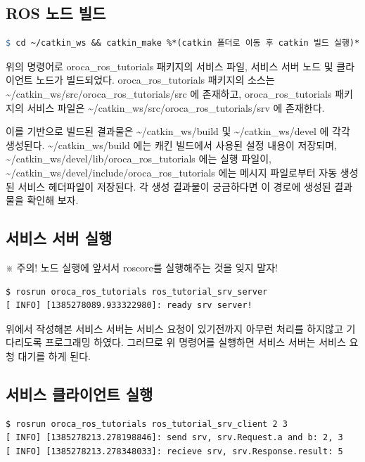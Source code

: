 \subsection{ROS 노드 빌드}

\begin{lstlisting}[language=make]
$ cd ~/catkin_ws && catkin_make %*(catkin 폴더로 이동 후 catkin 빌드 실행)*)
\end{lstlisting}

위의 명령어로 oroca\_ros\_tutorials 패키지의 서비스 파일, 서비스 서버 노드 및 클라이언트 노드가 빌드되었다. oroca\_ros\_tutorials 패키지의 소스는 \textasciitilde/catkin\_ws/src/oroca\_ros\_tutorials/src 에 존재하고, oroca\_ros\_tutorials 패키지의 서비스 파일은 \textasciitilde/catkin\_ws/src/oroca\_ros\_tutorials/srv 에 존재한다.

이를 기반으로 빌드된 결과물은 \textasciitilde/catkin\_ws/build 및 \textasciitilde/catkin\_ws/devel 에 각각 생성된다. \textasciitilde/catkin\_ws/build 에는 캐킨 빌드에서 사용된 설정 내용이 저장되며, \textasciitilde/catkin\_ws/devel/lib/oroca\_ros\_tutorials 에는 실행 파일이, \textasciitilde/catkin\_ws/devel/include/oroca\_ros\_tutorials 에는 메시지 파일로부터 자동 생성된 서비스 헤더파일이 저장된다. 각 생성 결과물이 궁금하다면 이 경로에 생성된 결과물을 확인해 보자.

\subsection{서비스 서버 실행}

※ 주의! 노드 실행에 앞서서 roscore를 실행해주는 것을 잊지 말자!

\begin{lstlisting}[language=ROS]
$ rosrun oroca_ros_tutorials ros_tutorial_srv_server 
[ INFO] [1385278089.933322980]: ready srv server!
\end{lstlisting}

위에서 작성해본 서비스 서버는 서비스 요청이 있기전까지 아무런 처리를 하지않고 기다리도록 프로그래밍 하였다. 그러므로 위 명령어를 실행하면 서비스 서버는 서비스 요청 대기를 하게 된다.

\subsection{서비스 클라이언트 실행}

\begin{lstlisting}[language=ROS]
$ rosrun oroca_ros_tutorials ros_tutorial_srv_client 2 3
[ INFO] [1385278213.278198846]: send srv, srv.Request.a and b: 2, 3
[ INFO] [1385278213.278348033]: recieve srv, srv.Response.result: 5
\end{lstlisting}

